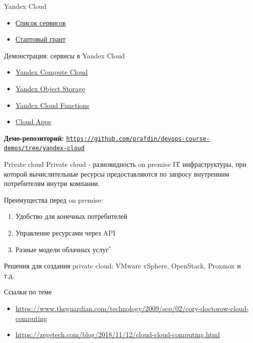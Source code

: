 \documentclass[aspectratio=169]{beamer}
\begin{document}
    \begin{frame}{Yandex Cloud}
        \begin{itemize}
            \item \href{https://yandex.cloud/ru/docs/overview/concepts/services}{Список сервисов}
            \item \href{https://yandex.cloud/ru/docs/getting-started/usage-grant}{Стартовый грант}
        \end{itemize}
    \end{frame}

    \begin{frame}{Демонстрация: сервисы в Yandex Cloud}
        \begin{itemize}
            \item \href{https://yandex.cloud/ru/docs/compute/}{Yandex Compute Cloud}
            \item \href{https://yandex.cloud/ru/docs/storage/}{Yandex Object Storage}
            \item \href{https://yandex.cloud/ru/docs/functions/}{Yandex Cloud Functions}
            \item \href{https://yandex.cloud/ru/docs/cloud-apps/}{Cloud Apps}
        \end{itemize}
        \vspace{0.2cm}
        \textbf{Демо-репозиторий:}
        \href{https://github.com/prafdin/devops-course-demos/tree/yandex-cloud}{\texttt{https://github.com/prafdin/devops-course-demos/tree/yandex-cloud}}
    \end{frame}

    \begin{frame}{Private cloud}
        Private cloud - разновидность on premise IT инфраструктуры, при которой вычислительные ресурсы предоставляются по запросу
        внутренним потребителям внутри компании.

        Преимущества перед on premise:
        \begin{enumerate}
            \item Удобство для конечных потребителей
            \item Управление ресурсами через API
            \item Разные модели облачных услуг$^{*}$
        \end{enumerate}

        Решения для создания private cloud: VMware vSphere, OpenStack, Proxmox и т.д.
    \end{frame}

    \begin{frame}{Ссылки по теме}
        \begin{itemize}
            \item \url{https://www.theguardian.com/technology/2009/sep/02/cory-doctorow-cloud-computing}
            \item \url{https://zegetech.com/blog/2018/11/12/cloud-cloud-computing.html}
        \end{itemize}
    \end{frame}
\end{document}
